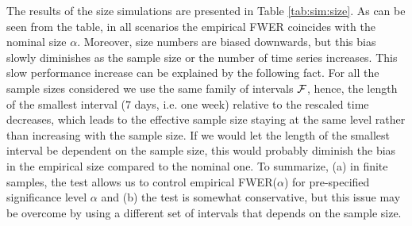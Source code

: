 \documentclass[a4paper,12pt]{article}
\numberwithin{equation}{section}
\begin{document}
The results of the size simulations are presented in Table \ref{tab:sim:size}. As can be seen from the table, in all scenarios the empirical FWER coincides with the nominal size $\alpha$. Moreover, size numbers are biased downwards, but this bias slowly diminishes as the sample size or the number of time series increases. This slow performance increase can be explained by the following fact. For all the sample sizes considered we use the same family of intervals $\mathcal{F}$, hence, the length of the smallest interval ($7$ days, i.e. one week) relative to the rescaled time decreases, which leads to the effective sample size staying at the same level rather than increasing with the sample size. If we would let the length of the smallest interval be dependent on the sample size, this would probably diminish the bias in the empirical size compared to the nominal one. To summarize, (a) in finite samples, the test allows us to control empirical FWER($\alpha$) for pre-specified significance level $\alpha$ and (b) the test is somewhat conservative, but this issue may be overcome by using a different set of intervals that depends on the sample size.
\end{document}
